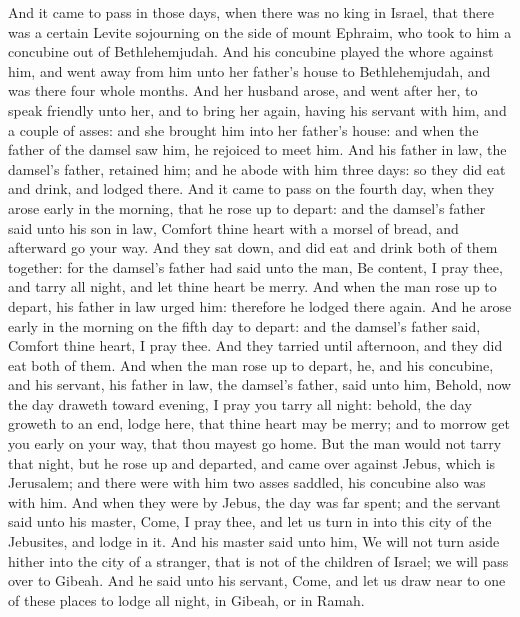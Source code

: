 \begin{biblechapter} %
 And it came to pass in those days, when there was no king in Israel, that there was a certain Levite sojourning on the side of mount Ephraim, who took to him a concubine out of Bethlehemjudah.
\verse And his concubine played the whore against him, and went away from him unto her father's house to Bethlehemjudah, and was there four whole months.
\verse And her husband arose, and went after her, to speak friendly unto her, and to bring her again, having his servant with him, and a couple of asses: and she brought him into her father's house: and when the father of the damsel saw him, he rejoiced to meet him.
\verse And his father in law, the damsel's father, retained him; and he abode with him three days: so they did eat and drink, and lodged there.
\verse And it came to pass on the fourth day, when they arose early in the morning, that he rose up to depart: and the damsel's father said unto his son in law, Comfort thine heart with a morsel of bread, and afterward go your way.
\verse And they sat down, and did eat and drink both of them together: for the damsel's father had said unto the man, Be content, I pray thee, and tarry all night, and let thine heart be merry.
\verse And when the man rose up to depart, his father in law urged him: therefore he lodged there again.
\verse And he arose early in the morning on the fifth day to depart: and the damsel's father said, Comfort thine heart, I pray thee. And they tarried until afternoon, and they did eat both of them.
\verse And when the man rose up to depart, he, and his concubine, and his servant, his father in law, the damsel's father, said unto him, Behold, now the day draweth toward evening, I pray you tarry all night: behold, the day groweth to an end, lodge here, that thine heart may be merry; and to morrow get you early on your way, that thou mayest go home.
\verse But the man would not tarry that night, but he rose up and departed, and came over against Jebus, which is Jerusalem; and there were with him two asses saddled, his concubine also was with him.
\verse And when they were by Jebus, the day was far spent; and the servant said unto his master, Come, I pray thee, and let us turn in into this city of the Jebusites, and lodge in it.
\verse And his master said unto him, We will not turn aside hither into the city of a stranger, that is not of the children of Israel; we will pass over to Gibeah.
\verse And he said unto his servant, Come, and let us draw near to one of these places to lodge all night, in Gibeah, or in Ramah.

\end{biblechapter}
